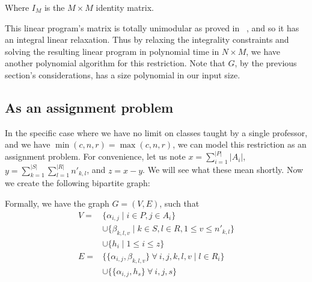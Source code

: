 Where $I_M$ is the $M \times M$ identity matrix.

This linear program's matrix is totally unimodular as proved in ~\cite{Ahuja93}, and so it has an integral linear relaxation. Thus by relaxing the integrality constraints and solving the resulting linear program in polynomial time in $N \times M$, we have another polynomial algorithm for this restriction. Note that $G$, by the previous section's considerations, has a size polynomial in our input size.

\subsection{As an assignment problem}

In the specific case where we have no limit on classes taught by a single professor, and we have $\min(c, n, r) = \max(c, n, r)$, we can model this restriction as an assignment problem. For convenience, let us note $x = \sum_{i = 1}^{|P|} |A_i|$, $y = \sum_{k = 1}^{|S|} \sum_{l = 1}^{|R|} n'_{k, l}$, and $z = x - y$. We will see what these mean shortly. Now we create the following bipartite graph:

\begin{center}
\end{center}

Formally, we have the graph $G = (V, E)$, such that
\begin{align*}
V = & \{\alpha_{i, j} \mid i \in P, j \in A_i\}\\
    & \cup \{\beta_{k, l, v} \mid k \in S, l \in R, 1 \le v \le n'_{k, l}\}\\
    & \cup \{h_i \mid 1 \le i \le z\}\\
E = & \{\{\alpha_{i, j}, \beta_{k, l, v}\}\ \forall\ i, j, k, l, v \mid l \in R_i\}\\
    & \cup \{\{\alpha_{i, j}, h_s\}\ \forall\ i, j, s\}
\end{align*}

